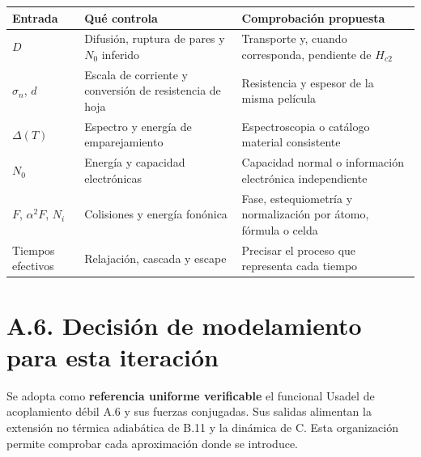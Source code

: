 \documentclass[
  spanish,
  10pt,
  a4paper,
]{article}
\newcounter{none} %
\begin{document}
{\def\LTcaptype{none} %
\begin{longtable}[]{@{}
  >{\raggedright\arraybackslash}p{}
  >{\raggedright\arraybackslash}p{}
  >{\raggedright\arraybackslash}p{}@{}}
\toprule\noalign{}
\begin{minipage}[b]{\linewidth}\raggedright
Entrada
\end{minipage} & \begin{minipage}[b]{\linewidth}\raggedright
Qué controla
\end{minipage} & \begin{minipage}[b]{\linewidth}\raggedright
Comprobación propuesta
\end{minipage} \\
\midrule\noalign{}
\endhead
\bottomrule\noalign{}
\endlastfoot
\(D\) & Difusión, ruptura de pares y \(N_0\) inferido & Transporte y,
cuando corresponda, pendiente de \(H_{c2}\) \\
\(\sigma_n\), \(d\) & Escala de corriente y conversión de resistencia de
hoja & Resistencia y espesor de la misma película \\
\(\Delta(T)\) & Espectro y energía de emparejamiento & Espectroscopia o
catálogo material consistente \\
\(N_0\) & Energía y capacidad electrónicas & Capacidad normal o
información electrónica independiente \\
\(F\), \(\alpha^2F\), \(N_i\) & Colisiones y energía fonónica & Fase,
estequiometría y normalización por átomo, fórmula o celda \\
Tiempos efectivos & Relajación, cascada y escape & Precisar el proceso
que representa cada tiempo \\
\end{longtable}
}

\section{A.6. Decisión de modelamiento para esta
iteración}\label{a.6.-decisiuxf3n-de-modelamiento-para-esta-iteraciuxf3n}

Se adopta como \textbf{referencia uniforme verificable} el funcional
Usadel de acoplamiento débil A.6 y sus fuerzas conjugadas. Sus salidas
alimentan la extensión no térmica adiabática de B.11 y la dinámica de C.
Esta organización permite comprobar cada aproximación donde se
introduce.
\end{document}
